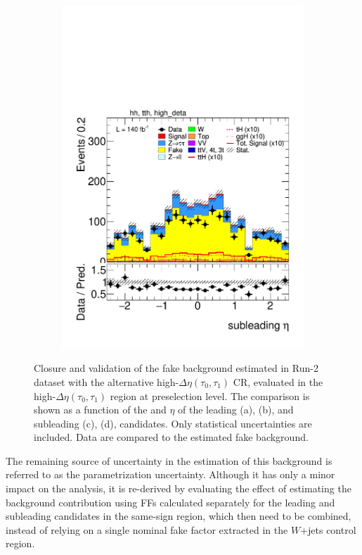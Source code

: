 \begin{figure}[htbp]
\begin{subfigure}[b]{0.45\textwidth}
          \includegraphics[width=\textwidth]{images/highdeta_highdeta_run2/plot_tau_1_eta_hh_tth_15_16_17_18_high_deta.pdf}
          \caption{}
        \end{subfigure}
        \caption{
    Closure and validation of the fake \tauhad background estimated in Run-2 dataset with the alternative high-$\Delta \eta (\tau_0, \tau_1)$ \tauhadhad CR, evaluated in the high-$\Delta \eta (\tau_0, \tau_1)$ region at preselection level.
    The comparison is shown as a function of the \pt and $\eta$ of the leading (a), (b), and subleading (c), (d), \tauhad candidates. Only statistical uncertainties are included.
    Data are compared to the estimated fake \tauhad background.
  }
  \label{fig:closure_validation_highdeta_run2}
\end{figure}

The remaining source of uncertainty in the estimation of this background is referred to as the parametrization uncertainty. Although it has only a minor impact on the analysis, it is re-derived by evaluating the effect of estimating the background contribution using FFs calculated separately for the leading and subleading \tauhad candidates in the \tauhadhad same-sign region, which then need to be combined, instead of relying on a single nominal fake factor extracted in the \taulephad $W$+jets control region.  

